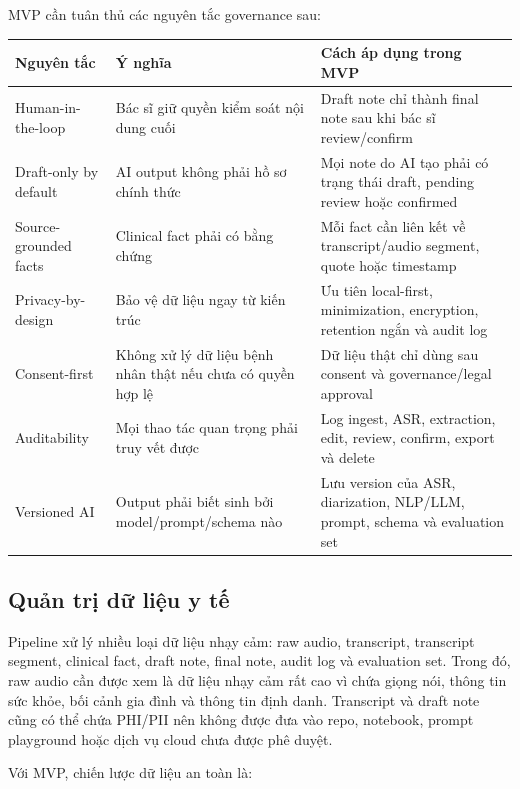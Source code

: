 \documentclass[12pt,a4paper]{article}
\begin{document}
MVP cần tuân thủ các nguyên tắc governance sau:

\begin{small}
\begin{longtable}{|p{}|p{}|p{}|}
\hline
\textbf{Nguyên tắc} & \textbf{Ý nghĩa} & \textbf{Cách áp dụng trong MVP} \\
\hline
Human-in-the-loop & Bác sĩ giữ quyền kiểm soát nội dung cuối & Draft note chỉ thành final note sau khi bác sĩ review/confirm \\
\hline
Draft-only by default & AI output không phải hồ sơ chính thức & Mọi note do AI tạo phải có trạng thái draft, pending review hoặc confirmed \\
\hline
Source-grounded facts & Clinical fact phải có bằng chứng & Mỗi fact cần liên kết về transcript/audio segment, quote hoặc timestamp \\
\hline
Privacy-by-design & Bảo vệ dữ liệu ngay từ kiến trúc & Ưu tiên local-first, minimization, encryption, retention ngắn và audit log \\
\hline
Consent-first & Không xử lý dữ liệu bệnh nhân thật nếu chưa có quyền hợp lệ & Dữ liệu thật chỉ dùng sau consent và governance/legal approval \\
\hline
Auditability & Mọi thao tác quan trọng phải truy vết được & Log ingest, ASR, extraction, edit, review, confirm, export và delete \\
\hline
Versioned AI & Output phải biết sinh bởi model/prompt/schema nào & Lưu version của ASR, diarization, NLP/LLM, prompt, schema và evaluation set \\
\hline
\end{longtable}
\end{small}

\subsection{Quản trị dữ liệu y tế}

Pipeline xử lý nhiều loại dữ liệu nhạy cảm: raw audio, transcript, transcript segment, clinical fact, draft note, final note, audit log và evaluation set. Trong đó, raw audio cần được xem là dữ liệu nhạy cảm rất cao vì chứa giọng nói, thông tin sức khỏe, bối cảnh gia đình và thông tin định danh. Transcript và draft note cũng có thể chứa PHI/PII nên không được đưa vào repo, notebook, prompt playground hoặc dịch vụ cloud chưa được phê duyệt.

Với MVP, chiến lược dữ liệu an toàn là:
\end{document}
